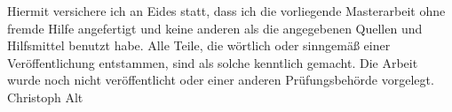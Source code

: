 \noindent
Hiermit versichere ich an Eides statt, dass ich die vorliegende Masterarbeit ohne fremde Hilfe angefertigt und keine anderen als die angegebenen Quellen und Hilfsmittel benutzt habe. Alle Teile, die w\"ortlich oder sinngem\"a\ss{} einer Ver\"offentlichung entstammen, sind als solche kenntlich gemacht. Die Arbeit wurde noch nicht ver\"offentlicht oder einer anderen Pr\"ufungsbeh\"orde vorgelegt. \\
\bigbreak
\noindent
Christoph Alt